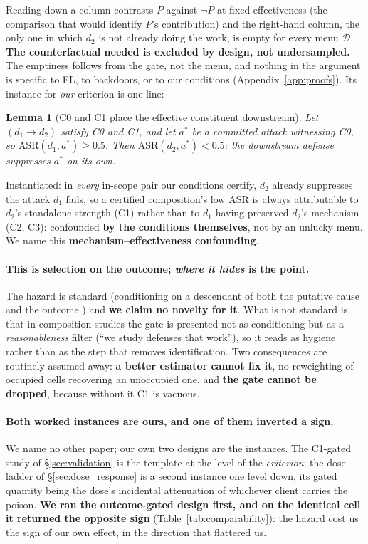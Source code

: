 \documentclass{article}
\newtheorem{lemma}{Lemma}
\begin{document}
\noindent Reading down a column contrasts $P$ against $\neg P$ at fixed effectiveness (the comparison that would identify $P$'s contribution) and the right-hand column, the only one in which $d_2$ is not already doing the work, is empty for every menu $\mathcal{D}$. \textbf{The counterfactual needed is excluded by design, not undersampled.} The emptiness follows from the gate, not the menu, and nothing in the argument is specific to FL, to backdoors, or to our conditions (Appendix~\ref{app:proofs}). Its instance for \emph{our} criterion is one line:

\begin{lemma}[C0 and C1 place the effective constituent downstream]
\label{lem:testability}
Let $(d_1 \to d_2)$ satisfy C0 and C1, and let $a^*$ be a committed attack witnessing C0, so $\mathrm{ASR}(d_1,a^*) \geq 0.5$. Then $\mathrm{ASR}(d_2,a^*) < 0.5$: the downstream defense suppresses $a^*$ \emph{on its own}.
\end{lemma}

\noindent Instantiated: in \emph{every} in-scope pair our conditions certify, $d_2$ already suppresses the attack $d_1$ fails, so a certified composition's low ASR is always attributable to $d_2$'s standalone strength (C1) rather than to $d_1$ having preserved $d_2$'s mechanism (C2, C3): confounded \textbf{by the conditions themselves}, not by an unlucky menu. We name this \textbf{mechanism--effectiveness confounding}.

\paragraph{This is selection on the outcome; \emph{where it hides} is the point.} The hazard is standard (conditioning on a descendant of both the putative cause and the outcome \citep{elwert2014endogenous,pearl2009causality}) and \textbf{we claim no novelty for it}. What is not standard is that in composition studies the gate is presented not as conditioning but as a \emph{reasonableness} filter (``we study defenses that work''), so it reads as hygiene rather than as the step that removes identification. Two consequences are routinely assumed away: \textbf{a better estimator cannot fix it}, no reweighting of occupied cells recovering an unoccupied one, and \textbf{the gate cannot be dropped}, because without it C1 is vacuous.

\paragraph{Both worked instances are ours, and one of them inverted a sign.} We name no other paper; our own two designs are the instances. The C1-gated study of \S\ref{sec:validation} is the template at the level of the \emph{criterion}; the dose ladder of \S\ref{sec:dose_response} is a second instance one level down, its gated quantity being the dose's incidental attenuation of whichever client carries the poison. \textbf{We ran the outcome-gated design first, and on the identical cell it returned the opposite sign} (Table~\ref{tab:comparability}): the hazard cost us the sign of our own effect, in the direction that flattered us.
\end{document}
